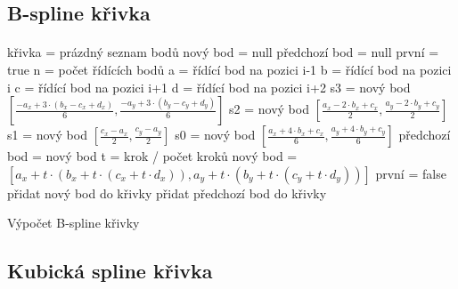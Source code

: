 \documentclass[12pt]{scrartcl}
\begin{document}
\subsection{B-spline křivka}
\paragraph{}
\begin{algorithm}[H]
	křivka = prázdný seznam bodů\;
	nový bod = null\;
	předchozí bod = null\;
	první = true\;
	n = počet řídících bodů\;
	 {
		a = řídící bod na pozici i-1\;
		b = řídící bod na pozici i\;
		c = řídící bod na pozici i+1\;
		d = řídící bod na pozici i+2\;
		s3 = nový bod $\left[ \frac{-a_x + 3 \cdot (b_x - c_x + d_x)}{6}, \frac{-a_y + 3 \cdot (b_y - c_y + d_y)}{6} \right] $\;
		s2 = nový bod $\left[ \frac{a_x - 2 \cdot b_x + c_x}{2}, \frac{a_y - 2 \cdot b_y + c_y}{2} \right] $\;		
		s1 = nový bod $\left[ \frac{c_x - a_x}{2}, \frac{c_y - a_y}{2} \right] $\;				
		s0 = nový bod $\left[ \frac{a_x + 4 \cdot b_x + c_x}{6}, \frac{a_y + 4 \cdot b_y + c_y}{6} \right] $\;			
		 {
			předchozí bod = nový bod\;
			t = krok / počet kroků\;
			nový bod = $\left[ a_x + t \cdot \left( b_x + t \cdot \left( c_x + t \cdot d_x \right) \right), a_y + t \cdot \left( b_y + t \cdot \left( c_y + t \cdot d_y \right) \right) \right] $\;
			{
			první = false\;
			}
			{
				přidat nový bod do křivky\;
				přidat předchozí bod do křivky\;
			}
		}
	}
 \caption{Výpočet B-spline křivky}
\end{algorithm}

\subsection{Kubická spline křivka}
\end{document}
